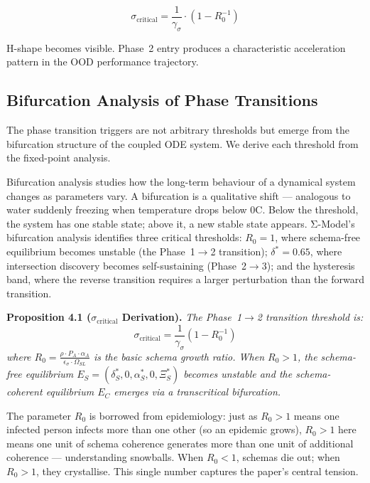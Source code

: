 \documentclass[11pt,a4paper]{article}
\begin{document}
\begin{equation}\label{eq:sigma-critical}
\sigma_{\text{critical}} = \frac{1}{\gamma_\sigma} \cdot (1 - R_0^{-1})
\end{equation}

H-shape becomes visible. Phase~2 entry produces a characteristic
acceleration pattern in the OOD performance trajectory.

\subsection{Bifurcation Analysis of Phase Transitions}\label{sec:bifurcation}

The phase transition triggers are not arbitrary thresholds but emerge from
the bifurcation structure of the coupled ODE system. We derive each
threshold from the fixed-point analysis.

Bifurcation analysis studies how the long-term behaviour of a dynamical system changes as parameters vary. A bifurcation is a qualitative shift --- analogous to water suddenly freezing when temperature drops below 0\textdegree C. Below the threshold, the system has one stable state; above it, a new stable state appears. Σ-Model's bifurcation analysis identifies three critical thresholds: $R_0 = 1$, where schema-free equilibrium becomes unstable (the Phase~1$\to$2 transition); $\delta^* = 0.65$, where intersection discovery becomes self-sustaining (Phase~2$\to$3); and the hysteresis band, where the reverse transition requires a larger perturbation than the forward transition.

\textbf{Proposition 4.1 ($\sigma_{\text{critical}}$ Derivation).}
\textit{The Phase~1$\to$2 transition threshold is:
\begin{equation}\label{eq:sigma-critical-derived}
\sigma_{\text{critical}} = \frac{1}{\gamma_\sigma}(1 - R_0^{-1})
\end{equation}
where $R_0 = \frac{\rho \cdot P_A \cdot \alpha_A}{\epsilon_\sigma \cdot \Omega_{SL}}$ is the
basic schema growth ratio. When $R_0 > 1$, the schema-free
equilibrium $E_S = (\delta_S^*, 0, \alpha_S^*, 0, \Xi_S^*)$ becomes unstable
and the schema-coherent equilibrium $E_C$ emerges via a transcritical
bifurcation.}

The parameter $R_0$ is borrowed from epidemiology: just as $R_0 > 1$ means one infected person infects more than one other (so an epidemic grows), $R_0 > 1$ here means one unit of schema coherence generates more than one unit of additional coherence --- understanding snowballs. When $R_0 < 1$, schemas die out; when $R_0 > 1$, they crystallise. This single number captures the paper's central tension.
\end{document}
